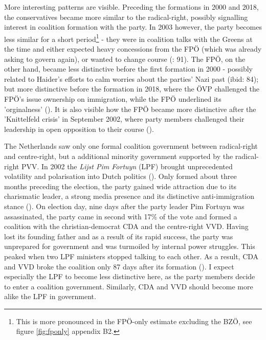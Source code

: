 \documentclass{article}
\begin{document}
More interesting patterns are visible. Preceding the formations in 2000 and 2018, the conservatives became more similar to the radical-right, possibly signalling interest in coalition formation with the party. In 2003 however, the party becomes less similar for a short period\footnote{This is more pronounced in the FPÖ-only estimate excluding the BZÖ, see figure \ref{fig:fponly} appendix B2.} - they were in coalition talks with the Greens at the time and either expected heavy concessions from the FPÖ (which was already asking to govern again), or wanted to change course (\cite{Luther2010}: 91). The FPÖ, on the other hand, became less distinctive before the first formation in 2000 - possibly related to Haider's efforts to calm worries about the parties' Nazi past (ibid: 84); but more distinctive before the formation in 2018, where the ÖVP challenged the FPÖ's issue ownership on immigration, while the FPÖ underlined its 'orginalness' (\cite{Bodlos2018}). It is also visible how the FPÖ became more distinctive after the 'Knittelfeld crisis' in September 2002, where party members challenged their leadership in open opposition to their course (\cite{Luther2002}). \par

The Netherlands saw only one formal coalition government between radical-right and centre-right, but a additional minority government supported by the radical-right PVV. In 2002 the \textit{Lijst Pim Fortuyn} (LPF) brought unprecedented volatility and polarisation into Dutch politics (\cite{Bischof2019a, VanderBrug2003}). Only formed about three months preceding the election, the party gained wide attraction due to its charismatic leader, a strong media presence and its distinctive anti-immigration stance (\cite{Koopmans2009}). On election day, nine days after the party leader Pim Fortuyn was assassinated, the party came in second with 17\% of the vote and formed a coalition with the christian-democrat CDA and the centre-right VVD. Having lost its founding father and as a result of its rapid success, the party was unprepared for government and was turmoiled by internal power struggles. This peaked when two LPF ministers stopped talking to each other. As a result, CDA and VVD broke the coalition only 87 days after its formation (\cite{Heinisch2003, Lucardie2007LPF}). I expect especially the LPF to become less distinctive here, as the party members decide to enter a coalition government. Similarly, CDA and VVD should become more alike the LPF in government.\par
\end{document}
